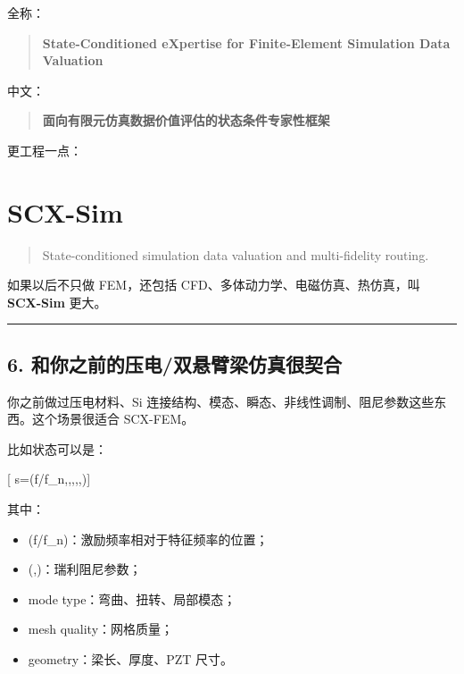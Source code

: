 \documentclass[
  12pt,
]{ctexart}
\providecommand{\tightlist}{%
  \setlength{\itemsep}{0pt}\setlength{\parskip}{0pt}}
\begin{document}
全称：

\begin{quote}
\textbf{State-Conditioned eXpertise for Finite-Element Simulation Data
Valuation}
\end{quote}

中文：

\begin{quote}
\textbf{面向有限元仿真数据价值评估的状态条件专家性框架}
\end{quote}

更工程一点：

\section{\texorpdfstring{\textbf{SCX-Sim}}{SCX-Sim}}\label{scx-sim}

\begin{quote}
State-conditioned simulation data valuation and multi-fidelity routing.
\end{quote}

如果以后不只做 FEM，还包括 CFD、多体动力学、电磁仿真、热仿真，叫
\textbf{SCX-Sim} 更大。

\begin{center}\rule{0.5\linewidth}{0.5pt}\end{center}

\subsection{6.
和你之前的压电/双悬臂梁仿真很契合}\label{ux548cux4f60ux4e4bux524dux7684ux538bux7535ux53ccux60acux81c2ux6881ux4effux771fux5f88ux5951ux5408}

你之前做过压电材料、Si
连接结构、模态、瞬态、非线性调制、阻尼参数这些东西。这个场景很适合
SCX-FEM。

比如状态可以是：

{[}
s=(f/f\_n,\alpha,\beta,,,){]}

其中：

\begin{itemize}
\tightlist
\item
  (f/f\_n)：激励频率相对于特征频率的位置；
\item
  (\alpha,\beta)：瑞利阻尼参数；
\item
  mode type：弯曲、扭转、局部模态；
\item
  mesh quality：网格质量；
\item
  geometry：梁长、厚度、PZT 尺寸。
\end{itemize}
\end{document}
